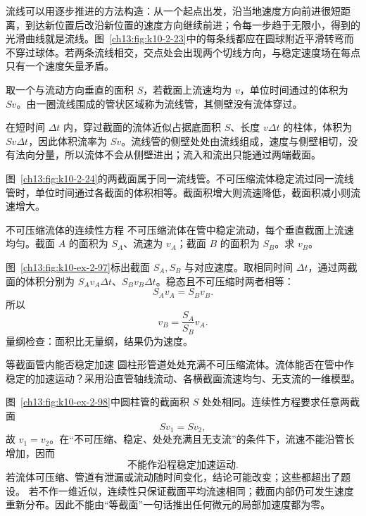 {流线可以用逐步推进的方法构造：从一个起点出发，沿当地速度方向前进很短距离，到达新位置后改沿新位置的速度方向继续前进；令每一步趋于无限小，得到的光滑曲线就是流线。图~\ref{ch13:fig:k10-2-23}中的每条线都应在圆球附近平滑转弯而不穿过球体。若两条流线相交，交点处会出现两个切线方向，与稳定速度场在每点只有一个速度矢量矛盾。

取一个与流动方向垂直的面积 $S$，若截面上流速均为 $v$，单位时间通过的体积为 $Sv$。由一圈流线围成的管状区域称为流线管，其侧壁没有流体穿过。

在短时间 $\Delta t$ 内，穿过截面的流体近似占据底面积 $S$、长度 $v\Delta t$ 的柱体，体积为 $Sv\Delta t$，因此体积流率为 $Sv$。流线管的侧壁处处由流线组成，速度与侧壁相切，没有法向分量，所以流体不会从侧壁进出；流入和流出只能通过两端截面。

\StreamtubeDiagram

图~\ref{ch13:fig:k10-2-24}的两截面属于同一流线管。不可压缩流体稳定流过同一流线管时，单位时间通过各截面的体积相等。截面积增大则流速降低，截面积减小则流速增大。

\begin{origexamplebox}{不可压缩流体的连续性方程}\label{ch13:ex:k10-2-97}
不可压缩流体在管中稳定流动，每个垂直截面上流速均匀。截面 $A$ 的面积为 $S_A$、流速为 $v_A$；截面 $B$ 的面积为 $S_B$。求 $v_B$。

\PipeContinuityDiagram
\end{origexamplebox}
\begin{xesolution}
\ThAFlowVolume

图~\ref{ch13:fig:k10-ex-2-97}标出截面 $S_A,S_B$ 与对应速度。取相同时间 $\Delta t$，通过两截面的体积分别为 $S_Av_A\Delta t$、$S_Bv_B\Delta t$。稳态且不可压缩时两者相等：
\[
S_Av_A=S_Bv_B.
\]
所以
\[
\boxed{v_B=\frac{S_A}{S_B}v_A}.
\]
量纲检查：面积比无量纲，结果仍为速度。
\end{xesolution}

\begin{origexamplebox}{等截面管内能否稳定加速}\label{ch13:ex:k10-2-98}
圆柱形管道处处充满不可压缩流体。流体能否在管中作稳定的加速运动？采用沿直管轴线流动、各横截面流速均匀、无支流的一维模型。

\UniformPipeDiagram
\end{origexamplebox}
\begin{xesolution}
\ThAUniformFlow

图~\ref{ch13:fig:k10-ex-2-98}中圆柱管的截面积 $S$ 处处相同。连续性方程要求任意两截面
\[
Sv_1=Sv_2,
\]
故 $v_1=v_2$。在“不可压缩、稳定、处处充满且无支流”的条件下，流速不能沿管长增加，因而
\[
\boxed{\text{不能作沿程稳定加速运动}}.
\]
若流体可压缩、管道有泄漏或流动随时间变化，结论可能改变；这些都超出了题设。
若不作一维近似，连续性只保证截面平均流速相同；截面内部仍可发生速度重新分布。因此不能由“等截面”一句话推出任何微元的局部加速度都为零。
\end{xesolution}

}
